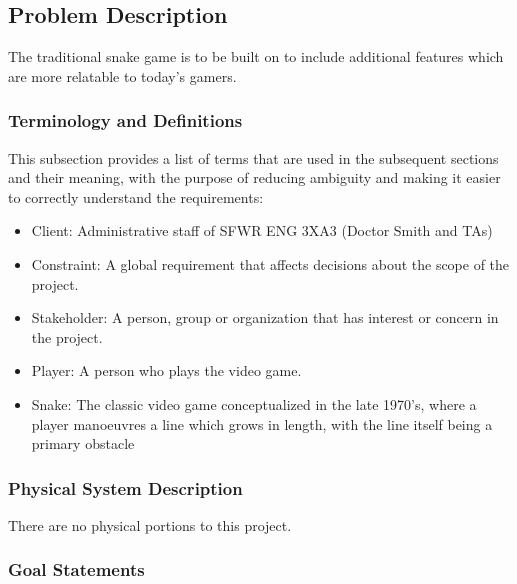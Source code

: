 \documentclass[12pt]{article}
\begin{document}
\subsection{Problem Description} \label{Sec_pd}

The traditional snake game is to be built on to include additional features which are more relatable to today’s gamers.


\subsubsection{Terminology and  Definitions}

This subsection provides a list of terms that are used in the subsequent
sections and their meaning, with the purpose of reducing ambiguity and making it
easier to correctly understand the requirements:

\begin{itemize}

\item Client: Administrative staff of SFWR ENG 3XA3 (Doctor Smith and TAs)
		 	 	 						
\item Constraint: A global requirement that affects decisions about the scope of the project. 
\item Stakeholder: A person, group or organization that has interest or concern in the project.

\item Player: A person who plays the video game.

\item Snake: The classic video game conceptualized in the late 1970’s, where a player manoeuvres a line which grows in length, with the line itself being a primary obstacle
				
\end{itemize}

\subsubsection{Physical System Description}


There are no physical portions to this project.



\subsubsection{Goal Statements}
\end{document}
